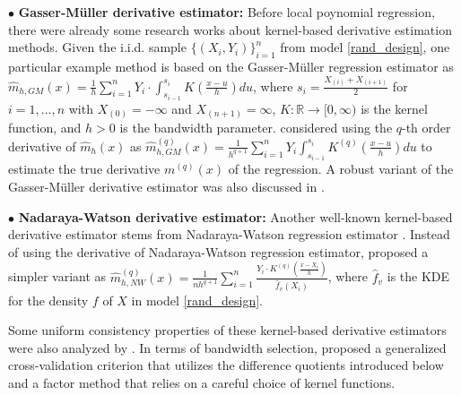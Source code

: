 \documentclass{uwstat572}
\theoremstyle{definition}
\renewcommand{\hat}{\widehat}
\theoremstyle{theorem}
\begin{document}
$\bullet$ {\bf Gasser-M{\"u}ller derivative estimator:}  Before local poynomial regression, there were already some research works about kernel-based derivative estimation methods. Given the i.i.d. sample $\{(X_i,Y_i)\}_{i=1}^n$ from model \eqref{rand_design}, one particular example method is based on the Gasser-M{\"u}ller regression estimator \citep{gasser1979kernel} as $\hat{m}_{h,GM}(x) = \frac{1}{h} \sum_{i=1}^n Y_i\cdot \int_{s_{i-1}}^{s_i} K\left(\frac{x-u}{h}\right) du$, where $s_i=\frac{X_{(i)}+X_{(i+1)}}{2}$ for $i=1,...,n$ with $X_{(0)}=-\infty$ and $X_{(n+1)}=\infty$, $K:\mathbb{R}\to [0,\infty)$ is the kernel function, and $h>0$ is the bandwidth parameter. \cite{gasser1984estimating} considered using the $q$-th order derivative of $\hat{m}_h(x)$ as $\hat{m}_{h,GM}^{(q)}(x) = \frac{1}{h^{q+1}} \sum\limits_{i=1}^n Y_i\int_{s_{i-1}}^{s_i} K^{(q)}\left(\frac{x-u}{h}\right) du$ to estimate the true derivative $m^{(q)}(x)$ of the regression. A robust variant of the Gasser-M{\"u}ller derivative estimator was also discussed in \cite{hardle1985robust}.

$\bullet$ {\bf Nadaraya-Watson derivative estimator:} Another well-known kernel-based derivative estimator stems from Nadaraya-Watson regression estimator \citep{nadaraya1964estimating,watson1964smooth}. Instead of using the derivative of Nadaraya-Watson regression estimator, \cite{mack1989derivative} proposed a simpler variant as $\hat{m}_{h,NW}^{(q)}(x) = \frac{1}{nh^{q+1}} \sum\limits_{i=1}^n \frac{Y_i \cdot K^{(q)}\left(\frac{x-X_i}{h}\right)}{\hat{f}_v(X_i)}$, where $\hat{f}_v$ is the KDE for the density $f$ of $X$ in model \eqref{rand_design}.

Some uniform consistency properties of these kernel-based derivative estimators were also analyzed by \cite{delecroix1996nonparametric}. In terms of bandwidth selection, \citet{rice1986bandwidth,muller1987bandwidth} proposed a generalized cross-validation criterion that utilizes the difference quotients introduced below and a factor method that relies on a careful choice of kernel functions.
\end{document}
